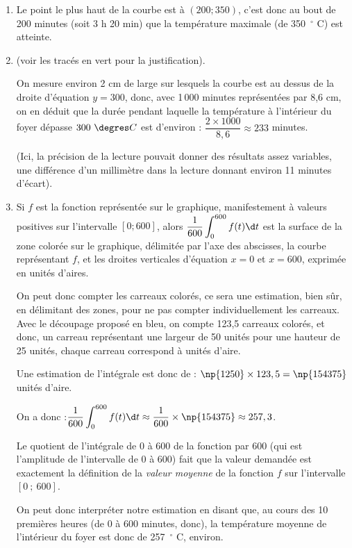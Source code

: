 \begin{enumerate}
	\item Le point le plus haut de la courbe est à $(200 ; 350)$, c'est donc au bout de 200 minutes (soit 3 h 20 min) que la température maximale (de 350~\ensuremath{^\circ} C) est atteinte.

	\item (voir les tracés en vert pour la justification).

On mesure environ 2 cm de large sur lesquels la courbe est au dessus de la droite d'équation $y=300$, donc, avec 1\,000 minutes représentées par 8,6 cm, on en déduit que la durée pendant laquelle la température à l'intérieur du foyer dépasse $300~\degres C$ est d'environ : $\dfrac{2\times 1000}{8,6} \approx 233$ minutes.

(Ici, la précision de la lecture pouvait donner des résultats assez variables, une différence d'un millimètre dans la lecture donnant environ 11 minutes d'écart).

	\item Si $f$ est la fonction représentée sur le graphique, manifestement à valeurs positives sur l'intervalle $[0 ; 600]$, alors $\displaystyle\dfrac{1}{600} \int_{0}^{600} f(t) \d t$ est la surface de la zone colorée sur le graphique, délimitée par l'axe des abscisses, la courbe représentant $f$, et les droites verticales d'équation $x = 0$ et $x = 600$, exprimée en unités d'aires.

On peut donc compter les carreaux colorés, ce sera une estimation, bien sûr, en délimitant des zones, pour ne pas compter individuellement les carreaux. Avec le découpage proposé en bleu, on compte 123,5 carreaux colorés, et donc, un carreau représentant une largeur de 50 unités pour une hauteur de 25 unités, chaque carreau correspond à  unités d'aire.

Une estimation de l'intégrale est donc de : \quad $\np{1250}\times 123,5 = \np{154375}$ unités d'aire.

On a donc :\quad  $\displaystyle\dfrac{1}{600} \int_{0}^{600} f(t) \d t \approx \dfrac{1}{600}\times \np{154375} \approx 257,3 $.

Le quotient de l'intégrale de 0 à 600 de la fonction par 600 (qui est l'amplitude de l'intervalle de 0 à 600) fait que la valeur demandée est exactement la définition de la \emph{valeur moyenne} de la fonction $f$ sur l'intervalle $[0~;~600]$.

On peut donc interpréter notre estimation en disant que, au cours des 10 premières heures (de 0 à 600 minutes, donc), la température moyenne de l'intérieur du foyer est donc de 257~\ensuremath{^\circ} C, environ.
\end{enumerate}

